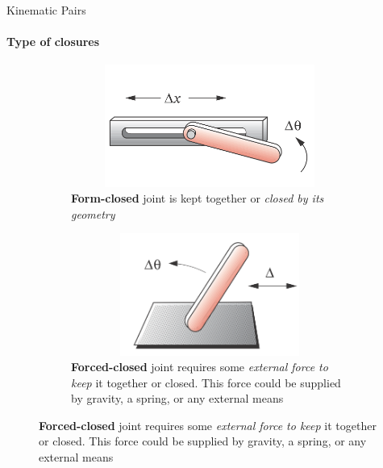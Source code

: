\documentclass[aspectratio=169]{beamer}
\begin{document}
\begin{frame}[t]{Kinematic Pairs}
\framesubtitle{Type of closures}
\vspace{-0.5cm}
\begin{figure}[H]
    \begin{subfigure}[t]{0.49\textwidth}
        \centering\includegraphics[height=4cm,width=1\textwidth,keepaspectratio]{RP_form_closed.png}
        \caption*{\textbf{Form-closed} joint is kept together or \textit{closed by its geometry}}
        \label{fig:RP_form_closed.png}
    \end{subfigure}
    \begin{subfigure}[t]{0.49\textwidth}
        \centering\includegraphics[height=4cm,width=1\textwidth,keepaspectratio]{RP_force_closed.png}
        \caption*{\textbf{Forced-closed} joint requires some \textit{external force to keep} it together or closed.  This force could be supplied by gravity, a spring, or any external means}
        \label{fig:RP_force_closed.png}
    \end{subfigure}
\end{figure}
\end{frame}
\end{document}
